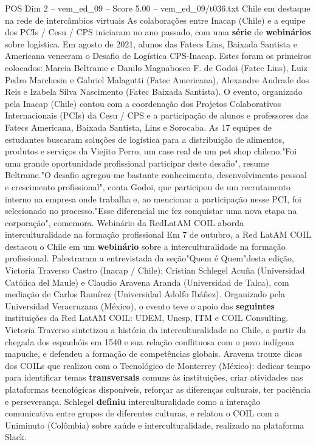 \begin{textsample}{POS Dim 2 – vem\_ed\_09 – Score 5.00 – vem\_ed\_09/t036.txt}  \label{ex:f2_pos_172}
Chile em destaque na rede de intercâmbios virtuais As colaborações entre Inacap (Chile) e a equipe dos PCIs / Cesu / CPS iniciaram no ano passado, com uma \textbf{série} de \textbf{webinários} sobre logística.
Em agosto de 2021, alunos das Fatecs Lins, Baixada Santista e Americana venceram o Desafio de Logística CPS-Inacap.
Estes foram os primeiros colocados: Marcia Beltrame e Danilo Magnabosco F. de Godoi (Fatec Lins), Luiz Pedro Marchesin e Gabriel Malagutti (Fatec Americana), Alexandre Andrade dos Reis e Izabela Silva Nascimento (Fatec Baixada Santista).
O evento, organizado pela Inacap (Chile) contou com a coordenação dos Projetos Colaborativos Internacionais (PCIs) da Cesu / CPS e a participação de alunos e professores das Fatecs Americana, Baixada Santista, Lins e Sorocaba.
As 17 equipes de estudantes buscaram soluções de logística para a distribuição de alimentos, produtos e serviços da Viejito Perro, um case real de um pet shop chileno."Foi uma grande oportunidade profissional participar deste desafio", resume Beltrame."O desafio agregou-me bastante conhecimento, desenvolvimento pessoal e crescimento profissional", conta Godoi, que participou de um recrutamento interno na empresa onde trabalha e, ao mencionar a participação nesse PCI, foi selecionado no processo."Esse diferencial me fez conquistar uma nova etapa na corporação", comemora.
Webinário da RedLatAM COIL aborda interculturalidade na formação profissional Em 7 de outubro, a Red LatAM COIL destacou o Chile em um \textbf{webinário} sobre a interculturalidade na formação profissional.
Palestraram a entrevistada da seção"Quem é Quem"desta edição, Victoria Traverso Castro (Inacap / Chile); Cristian Schlegel Acuña (Universidad Católica del Maule) e Claudio Aravena Aranda (Universidad de Talca), com mediação de Carlos Ramírez (Universidad Adolfo Ibáñez).
Organizado pela Universidad Veracruzana (México), o evento teve o apoio das \textbf{seguintes} instituições da Red LatAM COIL: UDEM, Unesp, ITM e COIL Consulting.
Victoria Traverso sintetizou a história da interculturalidade no Chile, a partir da chegada dos espanhóis em 1540 e sua relação conflituosa com o povo indígena mapuche, e defendeu a formação de competências globais.
Aravena trouxe dicas dos COILs que realizou com o Tecnológico de Monterrey (México): dedicar tempo para identificar temas \textbf{transversais} comuns às instituições, criar atividades nas plataformas tecnológicas disponíveis, reforçar as diferenças culturais, ter paciência e perseverança.
Schlegel \textbf{definiu} interculturalidade como a interação comunicativa entre grupos de diferentes culturas, e relatou o COIL com a Uniminuto (Colômbia) sobre saúde e interculturalidade, realizado na plataforma Slack.

\end{textsample}
